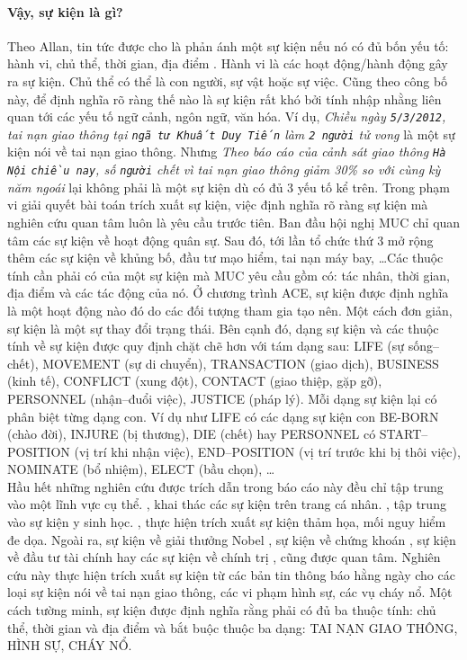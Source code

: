 \paragraph{Vậy, sự kiện là gì?} Theo Allan, tin tức được cho là phản ánh một sự kiện nếu nó có đủ bốn yếu tố:  hành vi, chủ thể, thời gian, địa điểm \cite{JRV98}. Hành vi là các hoạt động/hành động gây ra sự kiện. Chủ thể có thể là con người, sự vật hoặc sự việc. Cũng theo công bố này, để định nghĩa rõ ràng thế nào là sự kiện rất khó bởi tính nhập nhằng liên quan tới các yếu tố ngữ cảnh, ngôn ngữ, văn hóa. Ví dụ, \emph{Chiều ngày \texttt{5/3/2012}, tai nạn giao thông tại \texttt{ngã tư Khuất Duy Tiến} làm \texttt{2 người} tử vong} là một sự kiện nói về tai nạn giao thông. Nhưng \emph{Theo báo cáo của cảnh sát giao thông \texttt{Hà Nội} \texttt{chiều nay}, số \texttt{người} chết vì tai nạn giao thông giảm 30\% so với cùng kỳ năm ngoái} lại không phải là một sự kiện dù có đủ 3 yếu tố kể trên. Trong phạm vi giải quyết bài toán trích xuất sự kiện, việc định nghĩa rõ ràng sự kiện mà nghiên cứu quan tâm luôn là yêu cầu trước tiên. Ban đầu  hội nghị MUC chỉ quan tâm các sự kiện về hoạt động quân sự. Sau đó, tới lần tổ chức thứ 3 mở rộng thêm các sự kiện về khủng bố, đầu tư mạo hiểm, tai nạn máy bay, \ldots Các thuộc tính cần phải có của một sự kiện mà MUC yêu cầu gồm có: tác nhân, thời gian, địa điểm và các tác động của nó. Ở chương trình ACE, sự kiện được định nghĩa là một hoạt động nào đó do các đối tượng tham gia tạo nên. Một cách đơn giản, sự kiện là một sự thay đổi trạng thái. Bên cạnh đó, dạng sự kiện và các thuộc tính về sự kiện được quy định chặt chẽ hơn với tám dạng sau: LIFE (sự sống--chết), MOVEMENT (sự di chuyển), TRANSACTION (giao dịch), BUSINESS (kinh tế), CONFLICT (xung đột), CONTACT (giao thiệp, gặp gỡ), PERSONNEL (nhận--đuổi việc), JUSTICE (pháp lý). Mỗi dạng sự kiện lại có phân biệt từng dạng con. Ví dụ như LIFE có các dạng  sự kiện  con BE-BORN (chào đời), INJURE (bị thương), DIE (chết) hay PERSONNEL có START--POSITION (vị trí khi nhận việc), END--POSITION (vị trí trước khi bị thôi việc), NOMINATE (bổ nhiệm), ELECT (bầu chọn), \ldots
\\
\noindent Hầu hết những nghiên cứu được trích dẫn trong báo cáo này đều chỉ tập trung vào một lĩnh vực cụ thể. \cite{MM09}, \cite{YKW09} khai thác các sự kiện trên trang cá nhân.  \cite{CVJ09}, \cite{CHR04} tập trung vào sự kiện y sinh học. \cite{HJM08}, \cite{JHP07} thực hiện trích xuất sự kiện thảm họa, mối nguy hiểm đe dọa. Ngoài ra, sự kiện về giải thưởng Nobel \cite{FHH06}, sự kiện về chứng khoán \cite{FHD02}, sự kiện về đầu tư tài chính \cite{CM00} hay các sự kiện về chính trị \cite{FK08}, \cite{CM00} cũng được quan tâm. Nghiên cứu này thực hiện trích xuất sự kiện từ các bản tin thông báo hằng ngày cho các loại sự kiện nói về tai nạn giao thông, các vi phạm hình sự, các vụ cháy nổ. Một cách tường minh,  sự kiện được định nghĩa  rằng phải có đủ ba thuộc tính: chủ thể, thời gian và địa điểm và bắt buộc thuộc ba dạng: TAI NẠN GIAO THÔNG, HÌNH SỰ, CHÁY NỔ.

